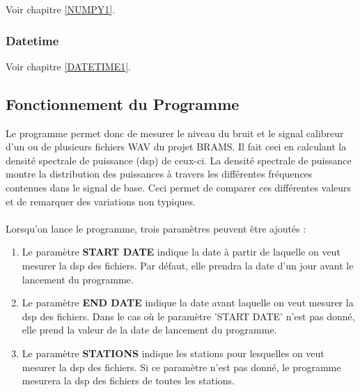 \documentclass[11pt]{article}
\begin{document}
Voir chapitre \ref{NUMPY1}.

\subsubsection{Datetime}

Voir chapitre \ref{DATETIME1}.

\subsection{Fonctionnement du Programme}

Le programme permet donc de mesurer le niveau du bruit et le signal calibreur d'un ou de plusieurs fichiers WAV du projet BRAMS.
Il fait ceci en calculant la densité spectrale de puissance (dsp) de ceux-ci.
La densité spectrale de puissance montre la distribution des puissances à travers les différentes fréquences contenues dans le signal de base.
Ceci permet de comparer ces différentes valeurs et de remarquer des variations non typiques.\\
\\
Lorsqu'on lance le programme, trois paramètres peuvent être ajoutés :
\begin{enumerate}
    \item Le paramètre \textbf{START DATE} indique la date à partir de laquelle on veut mesurer la dsp des fichiers.
          Par défaut, elle prendra la date d'un jour avant le lancement du programme.
    \item Le paramètre \textbf{END DATE} indique la date avant laquelle on veut mesurer la dsp des fichiers.
          Dans le cas où le paramètre 'START DATE' n'est pas donné, elle prend la valeur de la date de lancement du programme.
    \item Le paramètre \textbf{STATIONS} indique les stations pour lesquelles on veut mesurer la dsp des fichiers.
          Si ce paramètre n'est pas donné, le programme mesurera la dsp des fichiers de toutes les stations.
\end{enumerate}
\end{document}
